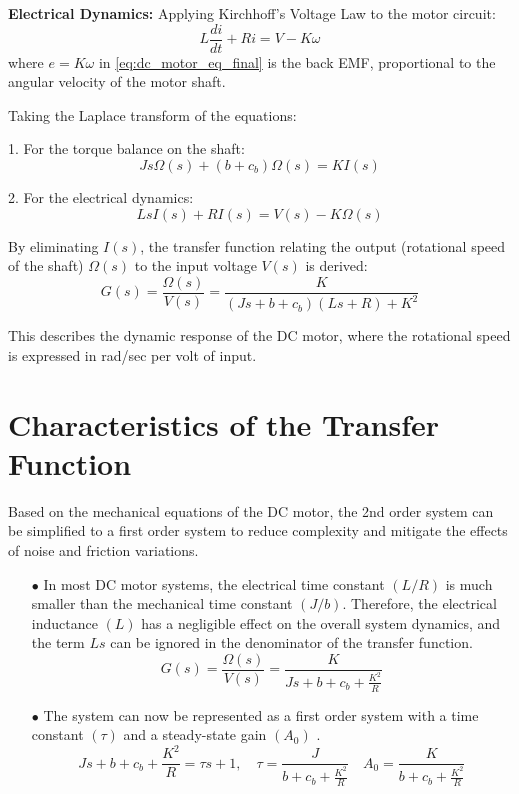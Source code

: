 \smallskip
\noindent \textbf{Electrical Dynamics:} Applying Kirchhoff's Voltage Law to the motor circuit:
\begin{equation}
    L\frac{d i}{dt} + R i = V - K \omega
    \label{eq:dc_motor_eq_final}
\end{equation}
where $e = K \omega$ in \eqref{eq:dc_motor_eq_final} is the back EMF, proportional to the angular velocity of the 
motor shaft.

Taking the Laplace transform of the equations:

1. For the torque balance on the shaft:
\begin{equation}
    J s \Omega(s) + (b + c_b) \Omega(s) = K I(s)
    \label{eq:shaft_eq_final_laplace}
\end{equation}

2. For the electrical dynamics:
\begin{equation}
    L s I(s) + R I(s) = V(s) - K \Omega(s)
    \label{eq:Kirchhoff_eq_final_laplace}
\end{equation}

By eliminating $I(s)$, the transfer function relating the output (rotational speed of the shaft) $\Omega(s)$ to the 
input voltage $V(s)$ is derived:
\begin{equation}
    G(s) = \frac{\Omega(s)}{V(s)} = \frac{K}{(J s + b + c_b)(L s + R) + K^2}
    \label{eq:2nd_st_order_TF}
\end{equation}

This describes the dynamic response of the DC motor, where the rotational speed is expressed in rad/sec per volt of 
input.

\section{Characteristics of the Transfer Function}
Based on the mechanical equations of the DC motor, the 2nd order system can be simplified to a first order system to 
reduce complexity and mitigate the effects of noise and friction variations.

\begin{enumerate}
    \item[$\bullet$] In most DC motor systems, the electrical time constant $(L/R)$ is much smaller than the mechanical time constant $(J/b)$. Therefore, the electrical inductance $(L)$ has a negligible effect on the overall system dynamics, and the term 
    $Ls$ can be ignored in the denominator of the transfer function.
    \begin{equation}
        G(s) = \frac{\Omega(s)}{V(s)} = \frac{K}{J s + b + c_b + \frac{K^2}{R}}
        \label{eq:2nd_to_1st_order_TF}
    \end{equation}
    \item[$\bullet$] The system can now be represented as a first order system with a time constant $(\tau)$ and a 
    steady-state gain $(A_0)$ .
    \begin{equation}
    {J s + b + c_b + \frac{K^2}{R}} = {\tau s + 1}, \quad \tau = \frac{J}{b + c_b + \frac{K^2}{R}} \quad A_0 = \frac{K}
    {b + c_b + \frac{K^2}{R}}
    \label{eq:tao_eq}
    \end{equation}
\end{enumerate}

